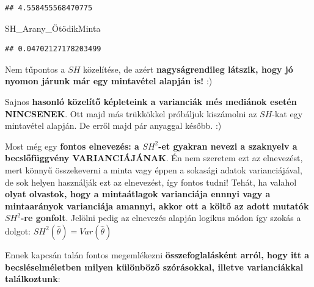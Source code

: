 \documentclass[
]{book}
\newenvironment{Shaded}{\begin{snugshade}}{\end{snugshade}}
\newcommand{\NormalTok}[1]{#1}
\begin{document}
\begin{verbatim}
## 4.558455568470775
\end{verbatim}

\begin{Shaded}
\begin{Highlighting}[]
\NormalTok{SH\_Arany\_ÖtödikMinta}
\end{Highlighting}
\end{Shaded}

\begin{verbatim}
## 0.04702127178203499
\end{verbatim}

Nem tűpontos a \(SH\) közelítése, de azért \textbf{nagyságrendileg látszik, hogy jó nyomon járunk már egy mintavétel alapján is!} :)

Sajnos \textbf{hasonló közelítő képleteink a varianciák més mediánok esetén NINCSENEK}. Ott majd más trükkökkel próbáljuk kiszámolni az \(SH\)-kat egy mintavétel alapján. De erről majd pár anyaggal később. :)

Most még egy \textbf{fontos elnevezés: a \(SH^2\)-et gyakran nevezi a szaknyelv a becslőfüggvény VARIANCIÁJÁNAK}. Én nem szeretem ezt az elnevezést, mert könnyű összekeverni a minta vagy éppen a sokasági adatok varianciájával, de sok helyen használják ezt az elnevezést, így fontos tudni! Tehát, ha valahol \textbf{olyat olvastok, hogy a mintaátlagok varianciája ennnyi vagy a mintaarányok varianciája amannyi, akkor ott a költő az adott mutatók \(SH^2\)-re gonfolt}. Jelölni pedig az elnevezés alapján logikus módon így szokás a dolgot: \(SH^2(\hat{\theta})=Var(\hat{\theta})\)

Ennek kapcsán talán fontos megemlékezni \textbf{összefoglalásként arról, hogy itt a becsléselméletben milyen különböző szórásokkal, illetve varianciákkal találkoztunk}:
\end{document}
